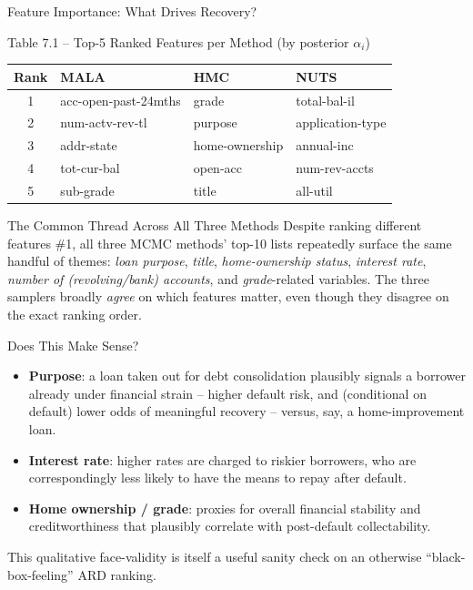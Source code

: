 \documentclass[aspectratio=169,10pt]{beamer}
\begin{document}
\begin{frame}[allowframebreaks]{Feature Importance: What Drives Recovery?}

\begin{block}{Table 7.1 -- Top-5 Ranked Features per Method (by posterior $\alpha_i$)}
\begin{center}
\small
\begin{tabular}{clll}
\toprule
Rank & MALA & HMC & NUTS \\
\midrule
1 & acc-open-past-24mths & grade & total-bal-il \\
2 & num-actv-rev-tl & purpose & application-type \\
3 & addr-state & home-ownership & annual-inc \\
4 & tot-cur-bal & open-acc & num-rev-accts \\
5 & sub-grade & title & all-util \\
\bottomrule
\end{tabular}
\end{center}
\end{block}

\begin{block}{The Common Thread Across All Three Methods}
Despite ranking different features \#1, all three MCMC methods' top-10 lists repeatedly surface the same handful of themes: \emph{loan purpose}, \emph{title}, \emph{home-ownership status}, \emph{interest rate}, \emph{number of (revolving/bank) accounts}, and \emph{grade}-related variables. The three samplers broadly \emph{agree} on which features matter, even though they disagree on the exact ranking order.
\end{block}

\framebreak

\begin{block}{Does This Make Sense?}
\begin{itemize}
  \item \textbf{Purpose}: a loan taken out for debt consolidation plausibly signals a borrower already under financial strain -- higher default risk, and (conditional on default) lower odds of meaningful recovery -- versus, say, a home-improvement loan.
  \item \textbf{Interest rate}: higher rates are charged to riskier borrowers, who are correspondingly less likely to have the means to repay after default.
  \item \textbf{Home ownership / grade}: proxies for overall financial stability and creditworthiness that plausibly correlate with post-default collectability.
\end{itemize}
This qualitative face-validity is itself a useful sanity check on an otherwise ``black-box-feeling'' ARD ranking.
\end{block}

\end{frame}
\end{document}
